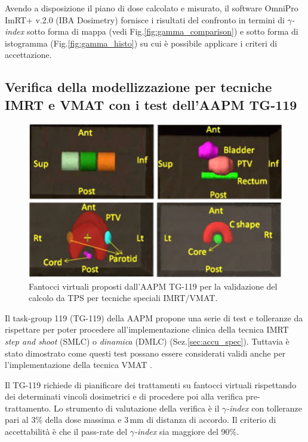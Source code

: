 Avendo a disposizione il piano di dose calcolato e misurato, il software OmniPro ImRT+ v.2.0 (IBA Dosimetry) fornisce i risultati del confronto in termini di $\gamma$\textit{-index} sotto forma di mappa (vedi Fig.\ref{fig:gamma_comparison}) e sotto forma di istogramma (Fig.\ref{fig:gamma_histo}) su cui è possibile applicare i criteri di accettazione.

\subsection{Verifica della modellizzazione per tecniche IMRT e VMAT con i test dell'AAPM TG-119}
\begin{figure}
\centering
\includegraphics[width=.8\textwidth]{./cap2/TG119_phantoms}
\caption{Fantocci virtuali proposti dall'AAPM TG-119 \cite{Ezzell2009} per la validazione del calcolo da TPS per tecniche speciali IMRT/VMAT.}
\label{fig:TG119_phantoms}
\end{figure}

Il task-group 119 (TG-119) della AAPM \cite{Ezzell2009} propone una serie di test e tolleranze da rispettare per poter procedere all'implementazione clinica della tecnica IMRT \textit{step and shoot} (SMLC) o \textit{dinamica} (DMLC) (Sez.\ref{sec:accu_spec}). Tuttavia è stato dimostrato come questi test possano essere considerati validi anche per l'implementazione della tecnica VMAT \cite{Mynampati2012}.

Il TG-119 richiede di pianificare dei trattamenti su fantocci virtuali rispettando dei determinati vincoli dosimetrici e di procedere poi alla verifica pre-trattamento. Lo strumento di valutazione della verifica è il $\gamma$\textit{-index} con tolleranze pari al 3\% della dose massima e $3\,$mm di distanza di accordo. Il criterio di accettabilità è che il pass-rate del $\gamma$\textit{-index} sia maggiore del 90\%.

